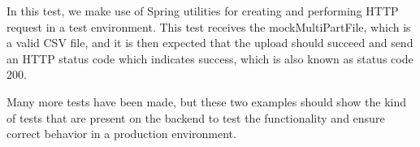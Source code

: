 In this test, we make use of Spring utilities for creating and performing HTTP request in a test
environment.
This test receives the mockMultiPartFile, which is a valid CSV file, and it is then expected that the
upload should succeed and send an HTTP status code which indicates success,
which is also known as status code 200.

Many more tests have been made, but these two examples should show the kind of tests that are
present on the backend to test the functionality and ensure correct behavior in a
production environment.
